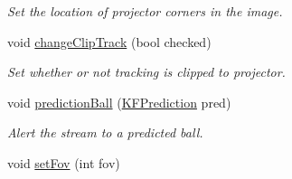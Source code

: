 \begin{DoxyCompactItemize}
\begin{DoxyCompactList}\small\item\em Set the location of projector corners in the image. \end{DoxyCompactList}\item 
void \hyperlink{classTrackingStream_a8adcb753d8000d41f0f4b94247fc6241}{change\+Clip\+Track} (bool checked)\hypertarget{classTrackingStream_a8adcb753d8000d41f0f4b94247fc6241}{}\label{classTrackingStream_a8adcb753d8000d41f0f4b94247fc6241}

\begin{DoxyCompactList}\small\item\em Set whether or not tracking is clipped to projector. \end{DoxyCompactList}\item 
void \hyperlink{classTrackingStream_ab87b740965236179e79e3b6c139102a1}{prediction\+Ball} (\hyperlink{classKFPrediction}{K\+F\+Prediction} pred)\hypertarget{classTrackingStream_ab87b740965236179e79e3b6c139102a1}{}\label{classTrackingStream_ab87b740965236179e79e3b6c139102a1}

\begin{DoxyCompactList}\small\item\em Alert the stream to a predicted ball. \end{DoxyCompactList}\item 
void \hyperlink{classTrackingStream_a4292499a860849bd5c80a8b3f182b0bd}{set\+Fov} (int fov)\hypertarget{classTrackingStream_a4292499a860849bd5c80a8b3f182b0bd}{}\label{classTrackingStream_a4292499a860849bd5c80a8b3f182b0bd}


\end{DoxyCompactItemize}
